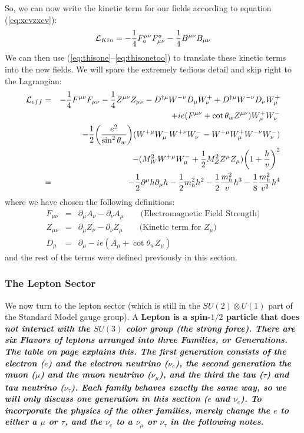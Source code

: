 \documentclass[12pt,epsf]{article}
\def\nolabel{\nonumber }
\def\nolabel{\nonumber }
\begin{document}
So, we can now write the kinetic term for our fields according to
equation (\ref{eq:xcvzxcv}):
\begin{eqnarray}
\mathcal{L}_{Kin} = -{1\over 4}F_a^{\mu \nu}F^a_{\mu \nu} - {1\over
4}B^{\mu \nu}B_{\mu \nu}\nolabel
\end{eqnarray}
We can then use (\ref{eq:thisone}--\ref{eq:thisonetoo}) to translate
these kinetic terms into the new fields.  We will spare the extremely
tedious detail and skip right to the Lagrangian:
\begin{eqnarray}
\mathcal{L}_{eff} &=& -{1\over 4} F^{\mu \nu}F_{\mu \nu} - {1\over
4}Z^{\mu \nu}Z_{\mu \nu} - D^{\dagger
\mu}W^{-\nu}D_{\mu}W^+_{\nu}+D^{\dagger \mu}W^{-\nu}D_{\nu}W^+_{\mu}
\nolabel \\
& & + i e (F^{\mu \nu} + \cot\theta_wZ^{\mu \nu})W^+_{\mu}W^-_{\nu}
\nolabel \\
& & -{1\over 2}\bigg({e^2 \over \sin^2\theta_w}\bigg)(W^{+\mu}W^-_{\mu}
W^{+\nu}W^-_{\nu} - W^{+\mu}W^+_{\mu} W^{-\nu}W^-_{\nu}) \nolabel \\
& & - (M^2_WW^{+\mu}W^-_{\mu} + {1\over 2}M^2_ZZ^{\mu}Z_{\mu})
\bigg(1+{h\over v}\bigg)^2 \nolabel \\
&=& -{1\over 2}\partial^{\mu}h\partial_{\mu}h - {1\over 2}m^2_hh^2 -
{1\over 2}{m_h^2\over v}h^3 - {1\over 8}{m_h^2\over v^2}h^4 \nolabel
\end{eqnarray}
where we have chosen the following definitions:
\begin{eqnarray}
F_{\mu \nu} &=& \partial_{\mu}A_{\nu} - \partial_{\nu}A_{\mu} \quad 
\quad \mbox{(Electromagnetic Field Strength)}  \nolabel\\
Z_{\mu \nu} &=& \partial_{\mu}Z_{\nu} - \partial_{\nu}Z_{\mu} \quad 
\quad \mbox{(Kinetic term for $Z_{\mu}$)} \nolabel\\
D_{\mu} &=& \partial_{\mu} - ie(A_{\mu}+\cot\theta_wZ_{\mu})\nolabel
\end{eqnarray}
and the rest of the terms were defined previously in this section.  

\subsubsection{The Lepton Sector}

We now turn to the lepton sector (which is still in the $SU(2)\otimes
U(1)$ part of the Standard Model gauge group).	A \bf Lepton \rm is a
spin-$1/2$ particle that does \it not \rm interact with the $SU(3)$
color group (the strong force).  There are six \bf Flavors \rm of
leptons arranged into three \bf Families\rm, or \bf Generations\rm. 
The table on page \pageref{standardmodelsummary} explains this.  The
first generation consists of the electron ($e$) and the electron
neutrino ($\nu_e$), the second generation the muon ($\mu$) and the muon
neutrino ($\nu_{\mu}$), and the third the tau ($\tau$) and tau neutrino
($\nu_{\tau}$).  Each family behaves exactly the same way, so we will
only discuss one generation in this section ($e$ and $\nu_e$).	To
incorporate the physics of the other families, merely change the $e$ to
either a $\mu$ or $\tau$, and the $\nu_e$ to a $\nu_{\mu}$ or
$\nu_{\tau}$ in the following notes.  
\end{document}
